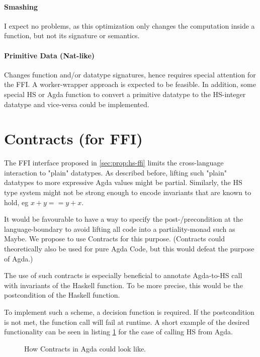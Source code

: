 \documentclass[12pt, a4paper, twoside]{report}
\begin{document}
\paragraph{Smashing}
I expect no problems, as this optimization only changes the computation inside a function, but not
its signature or semantics.

\paragraph{Primitive Data (Nat-like)}
Changes function and/or datatype signatures, hence requires special attention for the FFI.
A worker-wrapper approach is expected to be feasible. In addition, some special
HS or Agda function to convert a primitive datatype to the HS-integer datatype and vice-versa could be
implemented.

\section{Contracts (for FFI)}
The FFI interface proposed in \ref{sec:prop:hs-ffi} limits the cross-language interaction
to "plain" datatypes. As described before, lifting such "plain" datatypes to more expressive
Agda values might be partial. Similarly, the HS type system might not be strong enough
to encode invariants that are known to hold, eg $x + y == y + x$.

It would be favourable to have a way to specify the post-/precondition at the language-boundary
to avoid lifting all code into a partiality-monad such as Maybe.
We propose to use Contracts for this purpose. (Contracts could
theoretically also be used for pure Agda Code, but this would defeat the purpose of Agda.)

The use of such contracts is especially beneficial to annotate Agda-to-HS call with invariants
of the Haskell function. To be more precise, this would be the postcondition of the Haskell function.

To implement such a scheme, a decision function is required. If the postcondition is not met,
the function call will fail at runtime. A short example of the desired functionality can be seen in listing \ref{lst:agda-con-ex}
for the case of calling HS from Agda.


\begin{figure}

\caption{How Contracts in Agda could look like.}
\label{lst:agda-con-ex}
\end{figure}
\end{document}
